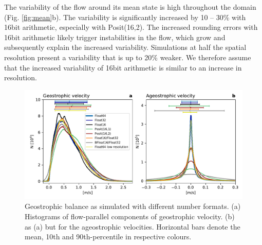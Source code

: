 \documentclass[draft]{agujournal2019}
\begin{document}
The variability of the flow around its mean state is high throughout the domain (Fig. \ref{fig:mean}b). The variability is significantly increased by 10 -- 30\% with 16bit arithmetic, especially with Posit(16,2). The increased rounding errors with 16bit arithmetic likely trigger instabilities in the flow, which grow and subsequently explain the increased variability. Simulations at half the spatial resolution present a variability that is up to 20\% weaker. We therefore assume that the increased variability of 16bit arithmetic is similar to an increase in resolution.

\begin{figure}
\includegraphics[width=1\textwidth]{../plots/ageostrophic.pdf}
\caption{Geostrophic balance as simulated with different number formats. (a) Histograms of flow-parallel components of geostrophic velocity. (b) as (a) but for the ageostrophic velocities. Horizontal bars denote the mean, 10th and 90th-percentile in respective colours.}
\label{fig:geo}
\end{figure}
\end{document}
